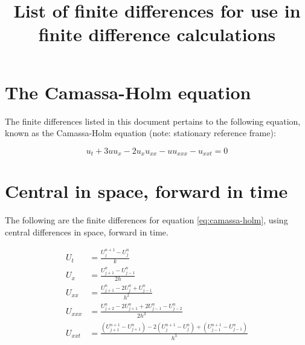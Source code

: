 \documentclass{article}
\begin{document}
\title{List of finite differences for use in finite difference calculations}
\maketitle

\section*{The Camassa-Holm equation}
The finite differences listed in this document pertains to the following equation, known as the Camassa-Holm equation (note: stationary reference frame):

\begin{equation}
\label{eq:camassa-holm}
u_t + 3uu_x - 2u_xu_{xx} - uu_{xxx} - u_{xxt} = 0
\end{equation}

\section*{Central in space, forward in time}
The following are the finite differences for equation \eqref{eq:camassa-holm}, using central differences in space, forward in time.

\begin{align}
U_t &= \frac{U_{j}^{n+1} - U_{j}^{n}}{k} \\
U_x &= \frac{U_{j+1}^n - U_{j-1}^n}{2h} \\
U_{xx} &= \frac{U_{j+1}^n - 2U_j^n + U_{j-1}^n}{h^2} \\
U_{xxx} &= \frac{U_{j+2}^n - 2U_{j+1}^n + 2U_{j-1}^n - U_{j-2}^n}{2h^3} \\
U_{xxt} &= \frac{(U_{j+1}^{n+1} - U_{j+1}^n) - 2(U_j^{n+1} - U_j^n) + (U_{j-1}^{n+1} - U_{j-1}^n)}{h^3}
\end{align}
\end{document}
